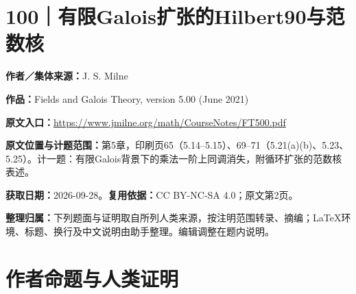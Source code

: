\documentclass[UTF8,11pt,a4paper]{ctexart}
\theoremstyle{definition}\newtheorem*{definition}{Definition}
\theoremstyle{remark}\newtheorem*{remark}{Remark}
\begin{document}
\section*{100｜有限Galois扩张的Hilbert90与范数核}
\textbf{作者／集体来源：}J. S. Milne

\textbf{作品：}Fields and Galois Theory, version 5.00 (June 2021)

\textbf{原文入口：}\url{https://www.jmilne.org/math/CourseNotes/FT500.pdf}

\textbf{原文位置与计题范围：}第5章，印刷页65（5.14--5.15）、69--71（5.21(a)(b)、5.23、5.25）。计一题：有限Galois背景下的乘法一阶上同调消失，附循环扩张的范数核表述。

\textbf{获取日期：}2026-09-28。\quad\textbf{复用依据：}CC BY-NC-SA 4.0；原文第2页。

\textbf{整理归属：}下列题面与证明取自所列人类来源，按注明范围转录、摘编；LaTeX环境、标题、换行及中文说明由助手整理。编辑调整在题内说明。

\section*{作者命题与人类证明}
\end{document}
